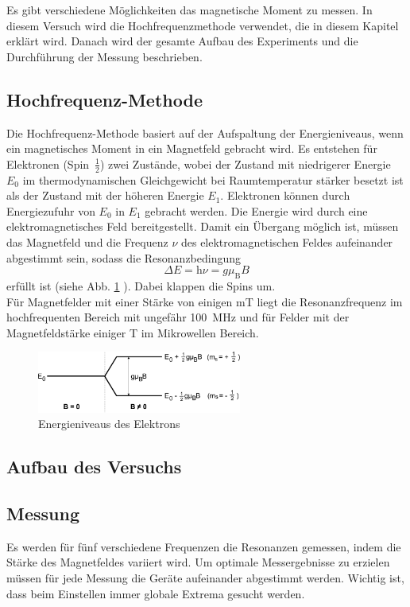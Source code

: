Es gibt verschiedene Möglichkeiten das magnetische Moment zu messen. In diesem Versuch wird die Hochfrequenzmethode verwendet, die in diesem Kapitel erklärt wird. Danach wird der gesamte Aufbau des Experiments und die Durchführung der Messung beschrieben.

\subsection{Hochfrequenz-Methode}
Die Hochfrequenz-Methode basiert auf der Aufspaltung der Energieniveaus, wenn ein magnetisches Moment in ein Magnetfeld gebracht wird. Es entstehen für Elektronen (Spin~$\frac{1}{2}$) zwei Zustände, wobei der Zustand mit niedrigerer Energie $E_0$ im thermodynamischen Gleichgewicht bei Raumtemperatur stärker besetzt ist als der Zustand mit der höheren Energie $E_1$. Elektronen können durch Energiezufuhr von $E_0$ in $E_1$ gebracht werden. Die Energie wird durch eine elektromagnetisches Feld bereitgestellt. Damit ein Übergang möglich ist, müssen das Magnetfeld und die Frequenz $\nu$ des elektromagnetischen Feldes aufeinander abgestimmt sein, sodass die Resonanzbedingung 
\begin{equation}
	\Delta E = \textrm{h} \nu = g \mu_\textrm{B} B
\end{equation}
erfüllt ist (siehe Abb. \ref{fig:elektron} ). Dabei klappen die Spins um. \\
Für Magnetfelder mit einer Stärke von einigen \si{\milli\tesla} liegt die Resonanzfrequenz im hochfrequenten Bereich mit ungefähr \SI{100}{\mega\hertz} und für Felder mit der Magnetfeldstärke einiger \si{\tesla} im Mikrowellen Bereich.
\\
\begin{figure}[h!]
	\centering
	\includegraphics[width=0.6\textwidth]{Anleitung_Abb6.pdf}
	\caption{Energieniveaus  des Elektrons \cite{V28}}
	\label{fig:elektron}
\end{figure}

\subsection{Aufbau des Versuchs}

\subsection{Messung}
Es werden für fünf verschiedene Frequenzen die Resonanzen gemessen, indem die Stärke des Magnetfeldes variiert wird. Um optimale Messergebnisse zu erzielen müssen für jede Messung die Geräte aufeinander abgestimmt werden. Wichtig ist, dass beim Einstellen immer globale Extrema gesucht werden.

